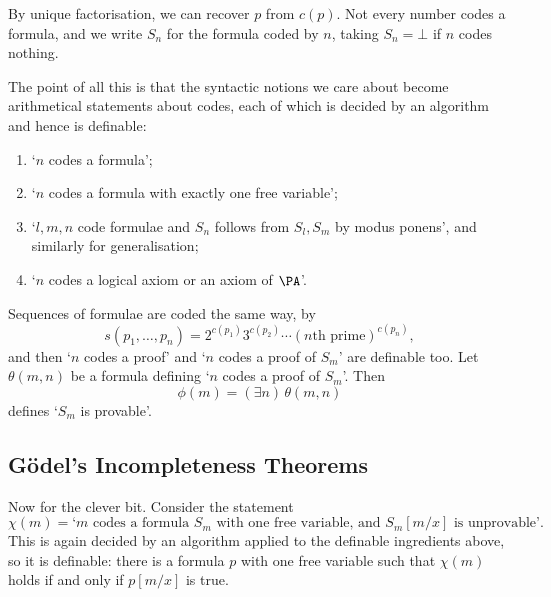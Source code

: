 \begin{center}
\end{center}

By unique factorisation, we can recover $p$ from $c(p)$. Not every number codes a formula, and we write $S_n$ for the formula coded by $n$, taking $S_n = \bot$ if $n$ codes nothing.

The point of all this is that the syntactic notions we care about become arithmetical statements about codes, each of which is decided by an algorithm and hence is definable:
\begin{enumerate}[label=(\roman*)]
  \item `$n$ codes a formula';
  \item `$n$ codes a formula with exactly one free variable';
  \item `$l, m, n$ code formulae and $S_n$ follows from $S_l, S_m$ by modus ponens', and similarly for generalisation;
  \item `$n$ codes a logical axiom or an axiom of $\PA$'.
\end{enumerate}
Sequences of formulae are coded the same way, by
$$s(p_1, \dots, p_n) = 2^{c(p_1)} 3^{c(p_2)} \cdots (n\text{th prime})^{c(p_n)},$$
and then `$n$ codes a proof' and `$n$ codes a proof of $S_m$' are definable too. Let $\theta(m, n)$ be a formula defining `$n$ codes a proof of $S_m$'. Then
$$\phi(m) = (\exists n)\,\theta(m, n)$$
defines `$S_m$ is provable'.

\subsection{G\"odel's Incompleteness Theorems}

Now for the clever bit. Consider the statement
$$\chi(m) = \text{`$m$ codes a formula $S_m$ with one free variable, and $S_m[m/x]$ is unprovable'}.$$
This is again decided by an algorithm applied to the definable ingredients above, so it is definable: there is a formula $p$ with one free variable such that $\chi(m)$ holds if and only if $p[m/x]$ is true.

